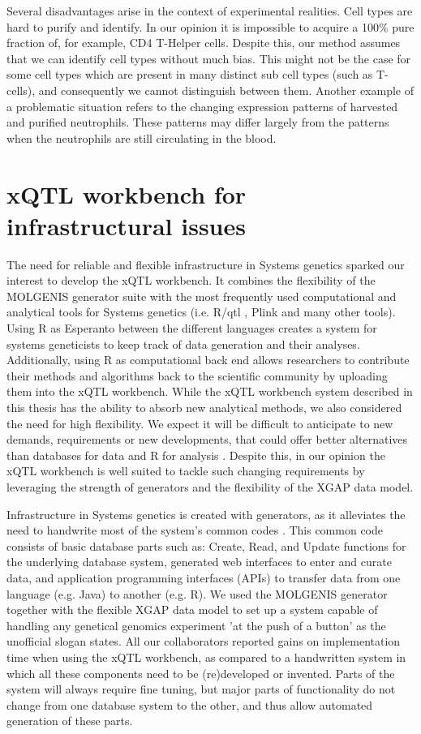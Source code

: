 Several disadvantages arise in the context of experimental realities. Cell types are hard to purify and identify. In our opinion it is impossible 
to acquire a 100\% pure fraction of, for example, CD4 T-Helper cells. Despite this, our method assumes that we can identify cell types without 
much bias. This might not be the case for some cell types which are present in many distinct sub cell types (such as T-cells), and consequently 
we cannot distinguish between them. Another example of a problematic situation refers to the changing expression patterns of harvested and purified 
neutrophils. These patterns may differ largely from the patterns when the neutrophils are still circulating in the blood.

\section{xQTL workbench for infrastructural issues}
The need for reliable and flexible infrastructure in Systems genetics sparked our interest to develop the xQTL workbench. It combines the flexibility 
of the MOLGENIS generator suite \cite{Swertz:2004} with the most frequently used computational and analytical tools for Systems genetics (i.e. R/qtl 
\cite{Broman:2003, Arends:2010}, Plink \cite{Purcell:2007} and many other tools). Using R as Esperanto between the different languages creates a system 
for systems geneticists to keep track of data generation and their analyses. Additionally, using R as computational back end allows researchers to 
contribute their methods and algorithms back to the scientific community by uploading them into the xQTL workbench. While the xQTL workbench system 
described in this thesis has the ability to absorb new analytical methods, we also considered the need for high flexibility. We expect it will be 
difficult to anticipate to new demands, requirements or new developments, that could offer better alternatives than databases for data and R for 
analysis \cite{R:2005}. Despite this, in our opinion the xQTL workbench is well suited to tackle such changing requirements by leveraging the strength of 
generators and the flexibility of the XGAP data model.

Infrastructure in Systems genetics is created with generators, as it alleviates the need to handwrite most of the system's common codes \cite{Swertz:2004}. This common 
code consists of basic database parts such as: Create, Read, and Update functions for the underlying database system, generated web interfaces to enter 
and curate data, and application programming interfaces (APIs) \cite{Swertz:2010b} to transfer data from one language (e.g. Java) to another (e.g. R). We used the MOLGENIS 
generator together with the flexible XGAP data model \cite{Swertz:2010a} to set up a system capable of handling any genetical genomics experiment 'at the push of a button' 
as the unofficial slogan states. All our collaborators reported gains on implementation time when using the xQTL workbench, as compared to a handwritten 
system in which all these components need to be (re)developed or invented. Parts of the system will always require fine tuning, but major parts of 
functionality do not change from one database system to the other, and thus allow automated generation of these parts.


